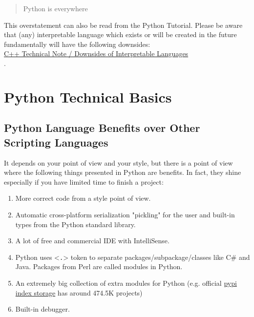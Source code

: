 \documentclass[
]{article}
\begin{document}
\begin{quote}
Python is everywhere
\end{quote}

This overstatement can also be read from the Python Tutorial. Please be
aware that (any) interpretable language which exists or will be created
in the future fundamentally will have the following downsides:\\
\href{https://github.com/burlachenkok/CPP_from_1998_to_2020/blob/main/Cpp-Technical-Note.md\#downsides-of-interpretable-languages}{C++
Technical Note / Downsides of Interpretable Languages\\
}.

\hypertarget{python-technical-basics}{%
\section{Python Technical Basics}\label{python-technical-basics}}

\hypertarget{python-language-benefits-over-other-scripting-languages}{%
\subsection{Python Language Benefits over Other Scripting
Languages}\label{python-language-benefits-over-other-scripting-languages}}

It depends on your point of view and your style, but there is a point of
view where the following things presented in Python are benefits. In
fact, they shine especially if you have limited time to finish a
project:

\begin{enumerate}
\def\labelenumi{\arabic{enumi}.}
\item
  More correct code from a style point of view.
\item
  Automatic cross-platform serialization "pickling" for the user and
  built-in types from the Python standard library.
\item
  A lot of free and commercial IDE with IntelliSense.
\item
  Python uses \textless{}\texttt{.}\textgreater{} token to separate
  packages/subpackage/classes like C\# and Java. Packages from Perl are
  called modules in Python.
\item
  An extremely big collection of extra modules for Python (e.g. official
  \href{https://pypi.org/}{pypi index storage} has around 474.5K
  projects)
\item
  Built-in debugger.
\end{enumerate}
\end{document}
